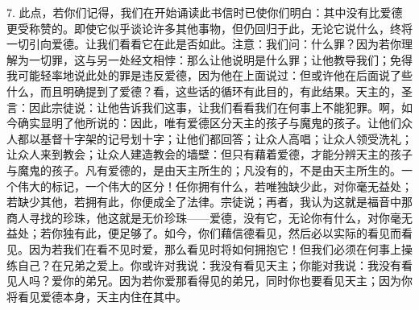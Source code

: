 7. 此点，若你们记得，我们在开始诵读此书信时已使你们明白：其中没有比爱德更受称赞的。即使它似乎谈论许多其他事物，但仍回归于此，无论它说什么，终将一切引向爱德。让我们看看它在此是否如此。注意：我们问：什么罪？因为若你理解为一切罪，这与另一处经文相悖：那么让他说明是什么罪；让他教导我们；免得我可能轻率地说此处的罪是违反爱德，因为他在上面说过：但或许他在后面说了些什么，而且明确提到了爱德？看，这些话的循环有此目的，有此结果。天主的，圣言：因此宗徒说：让他告诉我们这事，让我们看看我们在何事上不能犯罪。啊，如今确实显明了他所说的：因此，唯有爱德区分天主的孩子与魔鬼的孩子。让他们众人都以基督十字架的记号划十字；让他们都回答；让众人高唱；让众人领受洗礼；让众人来到教会；让众人建造教会的墙壁：但只有藉着爱德，才能分辨天主的孩子与魔鬼的孩子。凡有爱德的，是由天主所生的；凡没有的，不是由天主所生的。一个伟大的标记，一个伟大的区分！任你拥有什么，若唯独缺少此，对你毫无益处；若缺少其他，若拥有此，你便成全了法律。宗徒说；再者，我认为这就是福音中那商人寻找的珍珠，他这就是无价珍珠——爱德，没有它，无论你有什么，对你毫无益处；若你独有此，便足够了。如今，你们藉信德看见，然后必以实际的看见而看见。因为若我们在看不见时爱，那么看见时将如何拥抱它！但我们必须在何事上操练自己？在兄弟之爱上。你或许对我说：我没有看见天主；你能对我说：我没有看见人吗？爱你的弟兄。因为若你爱那看得见的弟兄，同时你也要看见天主；因为你将看见爱德本身，天主内住在其中。\par


